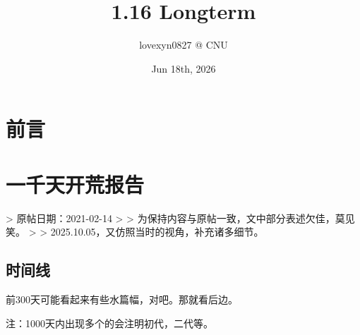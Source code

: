 \documentclass[openany]{book}
\title{1.16 Longterm}
\author{lovexyn0827 @ CNU}
\date{Jun 18th, 2026}
\theoremstyle{remark}\newtheorem*{remark}{Remark}
\begin{document}
	
	\maketitle
	
	\frontmatter
	
	\chapter{前言}
	
	\tableofcontents
	
	\mainmatter
	
	\chapter{一千天开荒报告}
	
	> 原帖日期：2021-02-14
	>
	> 为保持内容与原帖一致，文中部分表述欠佳，莫见笑。
	>
	> 2025.10.05，又仿照当时的视角，补充诸多细节。
	
	\section{时间线}
	
	前300天可能看起来有些水篇幅，对吧。那就看后边。
	
	注：1000天内出现多个的会注明初代，二代等。
	
\end{document}

